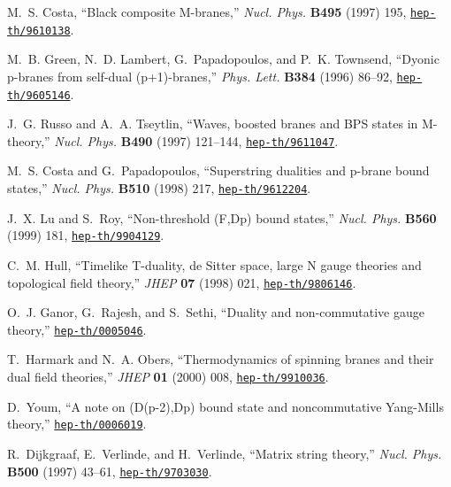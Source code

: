 \documentclass[a4paper,twoside,titlepage,12pt]{article}
\begin{document}
\begin{thebibliography}{10}
M.~S. Costa, ``Black composite {M-branes},'' {\em Nucl. Phys.} {\bf B495}
  (1997) 195,
\href{http://www.arXiv.org/abs/hep-th/9610138}{{\tt hep-th/9610138}}.

M.~B. Green, N.~D. Lambert, G.~Papadopoulos, and P.~K. Townsend, ``Dyonic
  p-branes from self-dual (p+1)-branes,'' {\em Phys. Lett.} {\bf B384} (1996)
  86--92,
\href{http://www.arXiv.org/abs/hep-th/9605146}{{\tt hep-th/9605146}}.

J.~G. Russo and A.~A. Tseytlin, ``Waves, boosted branes and {BPS} states in
  {M}-theory,'' {\em Nucl. Phys.} {\bf B490} (1997) 121--144,
\href{http://www.arXiv.org/abs/hep-th/9611047}{{\tt hep-th/9611047}}.

M.~S. Costa and G.~Papadopoulos, ``Superstring dualities and p-brane bound
  states,'' {\em Nucl. Phys.} {\bf B510} (1998) 217,
\href{http://www.arXiv.org/abs/hep-th/9612204}{{\tt hep-th/9612204}}.

J.~X. Lu and S.~Roy, ``Non-threshold {(F,Dp)} bound states,'' {\em Nucl. Phys.}
  {\bf B560} (1999) 181,
\href{http://www.arXiv.org/abs/hep-th/9904129}{{\tt hep-th/9904129}}.

C.~M. Hull, ``Timelike {T-duality}, de {Sitter} space, large {N} gauge theories
  and topological field theory,'' {\em JHEP} {\bf 07} (1998) 021,
\href{http://www.arXiv.org/abs/hep-th/9806146}{{\tt hep-th/9806146}}.

O.~J. Ganor, G.~Rajesh, and S.~Sethi, ``Duality and non-commutative gauge
  theory,''
\href{http://www.arXiv.org/abs/hep-th/0005046}{{\tt hep-th/0005046}}.

T.~Harmark and N.~A. Obers, ``Thermodynamics of spinning branes and their dual
  field theories,'' {\em JHEP} {\bf 01} (2000) 008,
\href{http://www.arXiv.org/abs/hep-th/9910036}{{\tt hep-th/9910036}}.

D.~Youm, ``A note on {(D(p-2),Dp)} bound state and noncommutative {Yang-Mills}
  theory,''
\href{http://www.arXiv.org/abs/hep-th/0006019}{{\tt hep-th/0006019}}.

R.~Dijkgraaf, E.~Verlinde, and H.~Verlinde, ``Matrix string theory,'' {\em
  Nucl. Phys.} {\bf B500} (1997) 43--61,
  \href{http://www.arXiv.org/abs/hep-th/9703030}{{\tt hep-th/9703030}}.


\end{thebibliography}
\end{document}
